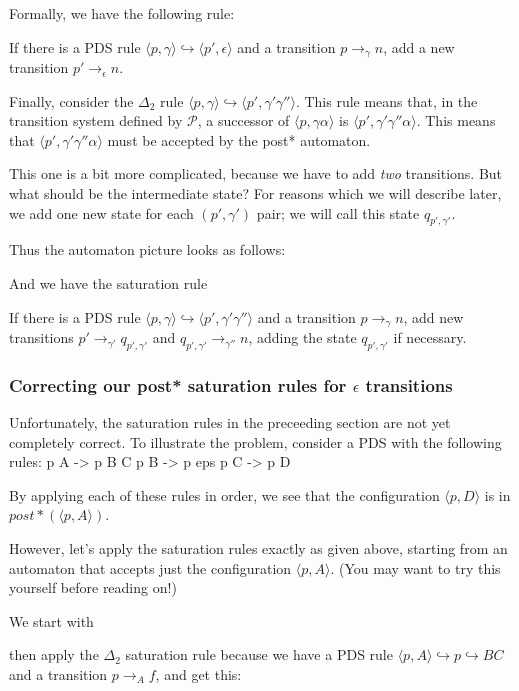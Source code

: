 \documentclass{article}
\newcommand{\Config}[2]{\ensuremath{\langle #1, #2 \rangle}}
\newcommand{\Rule}[2]{\ensuremath{#1 \hookrightarrow #2}}
\newcommand{\Trans}[3]{\ensuremath{#1 \rightarrow_{#2} #3}}
\begin{document}
Formally, we have the following rule:

   If there is a PDS rule
   \Rule{\Config{p}{\gamma}}{\Config{p'}{\epsilon}} and a transition
   \Trans{p}{\gamma}{n}, add a new transition
   \Trans{p'}{\epsilon}{n}.

Finally, consider the $\Delta_2$ rule
\Rule{\Config{p}{\gamma}}{\Config{p'}{\gamma'\gamma''}}. This rule
means that, in the transition system defined by $\mathcal{P}$, a
successor of \Config{p}{\gamma\alpha} is
\Config{p'}{\gamma'\gamma''\alpha}. This means that
\Config{p'}{\gamma'\gamma''\alpha} must be accepted by the post*
automaton.

This one is a bit more complicated, because we have to add \emph{two}
transitions. But what should be the intermediate state? For reasons
which we will describe later, we add one new state for each
$(p',\gamma')$ pair; we will call this state $q_{p',\gamma'}$.

Thus the automaton picture looks as follows:

And we have the saturation rule

   If there is a PDS rule
   \Rule{\Config{p}{\gamma}}{\Config{p'}{\gamma'\gamma''}} and a
   transition \Trans{p}{\gamma}{n}, add new transitions
   \Trans{p'}{\gamma'}{q_{p',\gamma'}} and
   \Trans{q_{p',\gamma'}}{\gamma''}{n}, adding the state $q_{p',\gamma'}$
   if necessary.


\subsubsection{Correcting our post* saturation rules for $\epsilon$
  transitions}

Unfortunately, the saturation rules in the preceeding section are not
yet completely correct. To illustrate the problem, consider a PDS with
the following rules:
   p A -> p B C
   p B -> p eps
   p C -> p D

By applying each of these rules in order, we see that the
configuration \Config{p}{D} is in $post*(\Config{p}{A})$.

However, let's apply the saturation rules exactly as given above,
starting from an automaton that accepts just the configuration
\Config{p}{A}. (You may want to try this yourself before reading on!)

We start with

then apply the $\Delta_2$ saturation rule because we have a PDS rule
\Rule{\Config{p}{A}}{\Rule{p}{B C}} and a transition \Trans{p}{A}{f},
and get this:
\end{document}
